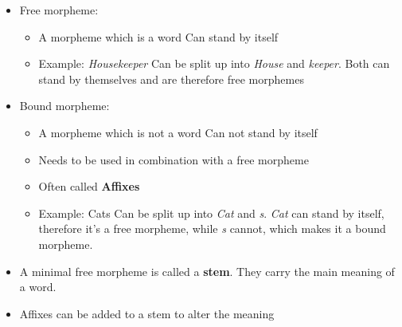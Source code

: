 \documentclass[
../../NLP4W_Summary.tex,
]
{subfiles}
\begin{document}
\begin{greenbox}
    \begin{itemize}
        \item Free morpheme:
        \begin{itemize}
            \item A morpheme which is a word \rightarrow Can stand by itself
            \item Example: \textit{Housekeeper} \rightarrow Can be split up into \textit{House} and \textit{keeper}. Both can stand by themselves and are therefore free morphemes
        \end{itemize}
        \item Bound morpheme:
        \begin{itemize}
            \item A morpheme which is not a word \rightarrow Can not stand by itself
            \item Needs to be used in combination with a free morpheme
            \item Often called \textbf{Affixes}
            \item Example: Cats \rightarrow Can be split up into \textit{Cat} and \textit{s}. \textit{Cat} can stand by itself, therefore it's a free morpheme, while \textit{s} cannot, which makes it a bound morpheme.
        \end{itemize}
        \item A minimal free morpheme is called a \textbf{stem}. They carry the main meaning of a word.
        \item Affixes can be added to a stem to alter the meaning
    \end{itemize}
\end{greenbox}
\end{document}
